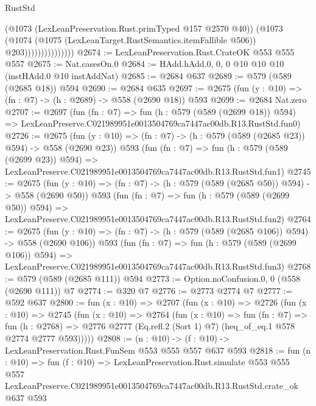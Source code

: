 \begin{lexlean}{RustStd}
\begin{coremodule}
                              (@1073 (LexLeanPreservation.Rust.primTyped @157 @2570 @40))
                              (@1073
                                (@1074
                                  (@1075 (LexLeanTarget.RustSemantics.itemFallible @506))
                                  @203)))))))))))))))
@2674 := LexLeanPreservation.Rust.CrateOK @553 @555 @557
@2675 := Nat.casesOn.{0}
@2684 := HAdd.hAdd.{0, 0, 0} @10 @10 @10 (instHAdd.{0} @10 instAddNat)
@2685 := @2684 @637
@2689 := @579 (@589 (@2685 @18)) @594
@2690 := @2684 @635
@2697 := @2675 (fun (y : @10) => (fn : @7) -> (h : @2689) -> @558 (@2690 @18)) @593
@2699 := @2684 Nat.zero
@2707 := @2697
    (fun (fn : @7) =>
    fun (h : @579 (@589 (@2699 @18)) @594) =>
    LexLeanPreserve.C021989951e0013504769ca7447ac00db.R13.RustStd.fun0)
@2726 := @2675
    (fun (y : @10) => (fn : @7) -> (h : @579 (@589 (@2685 @23)) @594) -> @558 (@2690 @23))
    @593
    (fun (fn : @7) =>
    fun (h : @579 (@589 (@2699 @23)) @594) =>
    LexLeanPreserve.C021989951e0013504769ca7447ac00db.R13.RustStd.fun1)
@2745 := @2675
    (fun (y : @10) => (fn : @7) -> (h : @579 (@589 (@2685 @50)) @594) -> @558 (@2690 @50))
    @593
    (fun (fn : @7) =>
    fun (h : @579 (@589 (@2699 @50)) @594) =>
    LexLeanPreserve.C021989951e0013504769ca7447ac00db.R13.RustStd.fun2)
@2764 := @2675
    (fun (y : @10) => (fn : @7) -> (h : @579 (@589 (@2685 @106)) @594) -> @558 (@2690 @106))
    @593
    (fun (fn : @7) =>
    fun (h : @579 (@589 (@2699 @106)) @594) =>
    LexLeanPreserve.C021989951e0013504769ca7447ac00db.R13.RustStd.fun3)
@2768 := @579 (@589 (@2685 @111)) @594
@2773 := Option.noConfusion.{0, 0} (@558 (@2690 @111)) @7
@2774 := @320 @7
@2776 := @2773 @2774 @7
@2777 := @592 @637
@2800 := fun (x : @10) =>
  @2707
    (fun (x : @10) =>
    @2726
      (fun (x : @10) =>
      @2745
        (fun (x : @10) =>
        @2764
          (fun (x : @10) =>
          fun (fn : @7) =>
          fun (h : @2768) =>
          @2776 @2777 (Eq.refl.{2} (Sort 1) @7) (heq_of_eq.{1} @578 @2774 @2777 @593)))))
@2808 := (n : @10) -> (f : @10) -> LexLeanPreservation.Rust.FunSem @553 @555 @557 @637 @593
@2818 := fun (n : @10) =>
  fun (f : @10) =>
  LexLeanPreservation.Rust.simulate
    @553
    @555
    @557
    LexLeanPreserve.C021989951e0013504769ca7447ac00db.R13.RustStd.crate_ok
    @637
    @593
\end{coremodule}
\end{lexlean}
